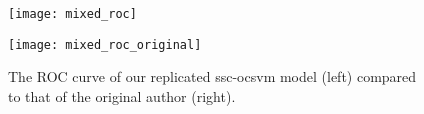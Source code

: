 \begin{figure}[htbp]
    \centering
    \begin{minipage}[h]{0.5\textwidth}
        \centering
        \texttt{[image: mixed\_roc]}
    \end{minipage}\hfill
    \begin{minipage}[h]{0.5\textwidth}
        \centering
        \texttt{[image: mixed\_roc\_original]}
    \end{minipage}
    \caption[Pu et al.\ replication ROC curve]{The ROC curve of our replicated \gls{ssc}-\gls{ocsvm} model (left) compared to that of the original author (right).\label{fig:pu_rep}}
\end{figure}

